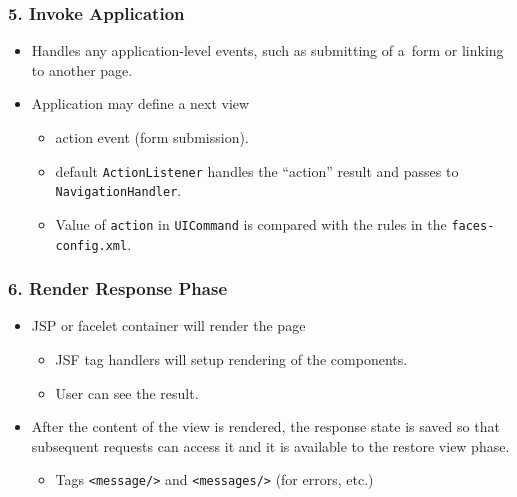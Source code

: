 \documentclass[10pt,xcolor=pdflatex]{beamer}
\begin{document}
\begin{frame}\frametitle{5. Invoke Application}
	\begin{itemize}
		\item Handles any application-level events, such as submitting of a~form or linking to another page.
		\item Application may define a next view
          \begin{itemize}
            \item action event (form submission).
        	\item default \texttt{ActionListener} handles the ``action'' result and passes to \texttt{NavigationHandler}.
            \item Value of \texttt{action} in \texttt{UICommand} is compared with the rules in the \texttt{faces-config.xml}.
          \end{itemize}
	\end{itemize}
\end{frame}


\begin{frame}\frametitle{6. Render Response Phase}
	\begin{itemize}
		\item JSP or facelet container will render the page
          \begin{itemize}
        	\item JSF tag handlers will setup rendering of the components.
        	\item User can see the result.
          \end{itemize}
		\item After the content of the view is rendered, the response state is saved so that subsequent requests can access it and it is available to the restore view phase.
          \begin{itemize}
            \item Tags \texttt{<message/>} and \texttt{<messages/>} (for errors, etc.)
          \end{itemize}
	\end{itemize}
\end{frame}
\end{document}
